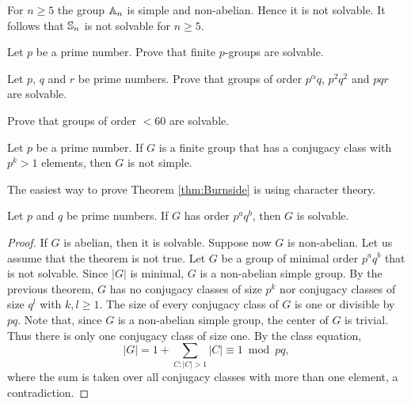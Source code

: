 \begin{example}
    For $n\geq5$ the group $\mathbb{A}_n$ is simple and non-abelian. Hence it 
    is not solvable. It follows that 
    $\mathbb{S}_n$ is not solvable for $n\geq5$. 
\end{example}

\begin{exercise}
\label{xca:pgroups_solvable}
Let $p$ be a prime number. Prove that finite $p$-groups are solvable.
\end{exercise}

\begin{exercise}
\label{xca:Robinson:5.4.1}
    Let $p$, $q$ and $r$ be prime numbers. Prove that groups
    of order $p^\alpha q$, $p^2q^2$ and $pqr$ are solvable. 
\end{exercise}

\begin{exercise}
\label{xca:less60}
    Prove that groups of order $<60$ are solvable. 
\end{exercise}


\begin{theorem}[Burnside]
        \label{thm:Burnside}
	Let $p$ be a prime number. If $G$ is a finite group that has 
        a conjugacy class with $p^k>1$ elements, then $G$ 
	is not simple.
\end{theorem}

The easiest way to prove Theorem \ref{thm:Burnside}
is using character theory. 

\begin{theorem}[Burnside]
  Let $p$ and $q$ be prime numbers. If $G$ has order $p^aq^b$, then $G$ is solvable.
\end{theorem}

\begin{proof}
	If $G$ is abelian, then it is solvable.
	Suppose now $G$ is non-abelian.
	Let us assume that the theorem is not true. Let $G$ be a group
	of minimal order $p^aq^b$
	that is not solvable. Since $|G|$ is minimal, $G$ is a non-abelian simple group.
	By the previous theorem, 
	$G$ has no conjugacy classes of size $p^k$ nor 
	conjugacy classes of size $q^l$ with $k,l\geq1$. The size
	of every conjugacy class of $G$ is one or divisible by $pq$. 
	Note that, since $G$ is a non-abelian simple group,
	the center of $G$ is trivial.
	Thus there is only one conjugacy class of size one.
	By the class
	equation,
	\[
		|G|=1+\sum_{C:|C|>1}|C|\equiv 1 \bmod pq,
	\]
	where the sum is taken over all conjugacy classes 
	with more than one element, a contradiction.
\end{proof}

